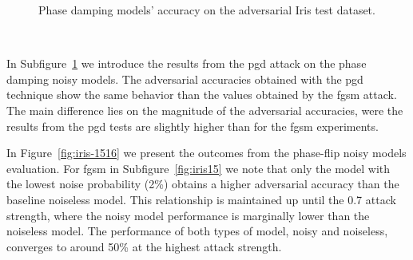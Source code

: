 \begin{figure}[!h]
\begin{subfigure}{0.45\textwidth}
      \label{fig:iris14}
  \end{subfigure}
  \caption{Phase damping models' accuracy on the adversarial Iris test dataset.}
  \label{fig:iris-1314}
\end{figure} \

In Subfigure~\ref{fig:iris14} we introduce the results from the \ac{pgd}
attack on the phase damping noisy models. The adversarial accuracies
obtained with the \ac{pgd} technique show the same behavior than the
values obtained by the \ac{fgsm} attack. The main difference lies
on the magnitude of the adversarial accuracies, were the results
from the \ac{pgd} tests are slightly higher than for the \ac{fgsm}
experiments. \

In Figure~\ref{fig:iris-1516} we present the outcomes from the phase-flip
noisy models evaluation. For \ac{fgsm} in Subfigure~\ref{fig:iris15}
we note that only the model with the lowest noise probability (2\%)
obtains a higher adversarial accuracy than the baseline noiseless
model. This relationship is maintained up until the 0.7 attack strength,
where the noisy model performance is marginally lower than the noiseless
model. The performance of both types of model, noisy and noiseless,
converges to around 50\% at the highest attack strength. \

